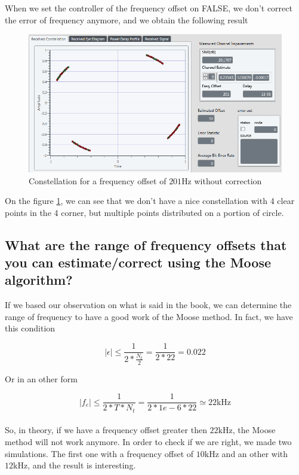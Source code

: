 \documentclass[frenchb, oneside, headings=normal]{scrartcl}
\begin{document}
When we set the controller of the frequency offset on FALSE, we don't correct the error of frequency anymore, and we obtain the following result

\begin{figure}[!ht]
\centering
\includegraphics[scale=0.7]{img/test_offset_201hz_OFF.PNG}
\caption{Constellation for a frequency offset of $201 \si{\hertz}$ without correction}
\label{freq_correct_off}
\end{figure}

On the figure \ref{freq_correct_off}, we can see  that we don't have a nice constellation with 4 clear points in the 4 corner, but multiple points distributed on a portion of circle.

\subsection{What are the range of frequency offsets that you can estimate/correct using the Moose algorithm?}

If we based our observation on what is said in the book, we can determine the range of frequency to have a good work of the Moose method. In fact, we have this condition

\begin{equation}
|\epsilon| \leq \frac{1}{2*\frac{N_t}{2}} = \frac{1}{2*22} = 0.022
\label{cdt1}
\end{equation}

Or in an other form 

\begin{equation}
|f_e| \leq \frac{1}{2*T*N_t} = \frac{1}{2*1e-6*22} \simeq 22 \si{\kilo\hertz}
\label{cdt2}
\end{equation}\\

So, in theory, if we have a frequency offset greater then $22 \si{\kilo\hertz}$, the Moose method will not work anymore. In order to check if we are right, we made two simulations. The first one with a frequency offset of $10 \si{\kilo\hertz}$ and an other with $12 \si{\kilo\hertz}$, and the result is interesting.\\
\end{document}
